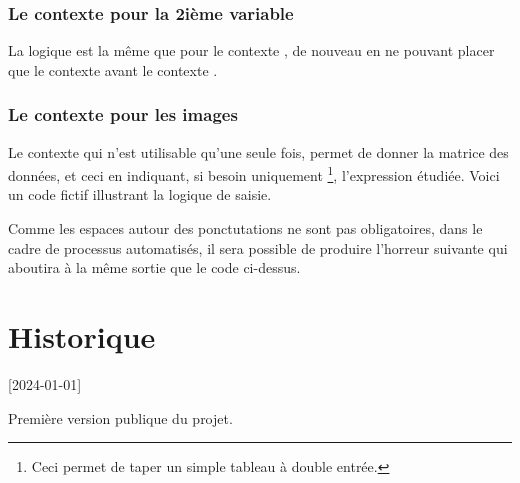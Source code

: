 
\subsubsection{Le contexte  pour la 2ième variable}

La logique est la même que pour le contexte , de nouveau en ne pouvant placer que le contexte  avant le contexte .



\subsubsection{Le contexte  pour les images}

Le contexte  qui n'est utilisable qu'une seule fois, permet de donner la matrice des données, et ceci en indiquant, si besoin uniquement
\footnote{
	Ceci permet de taper un simple tableau à double entrée.
},
l'expression étudiée.
Voici un code fictif illustrant la logique de saisie.




Comme les espaces autour des ponctutations ne sont pas obligatoires, dans le cadre de processus automatisés, il sera possible de produire l'horreur suivante qui aboutira à la même sortie que le code ci-dessus.

\section{Historique}

[2024-01-01]

Première version publique du projet.


